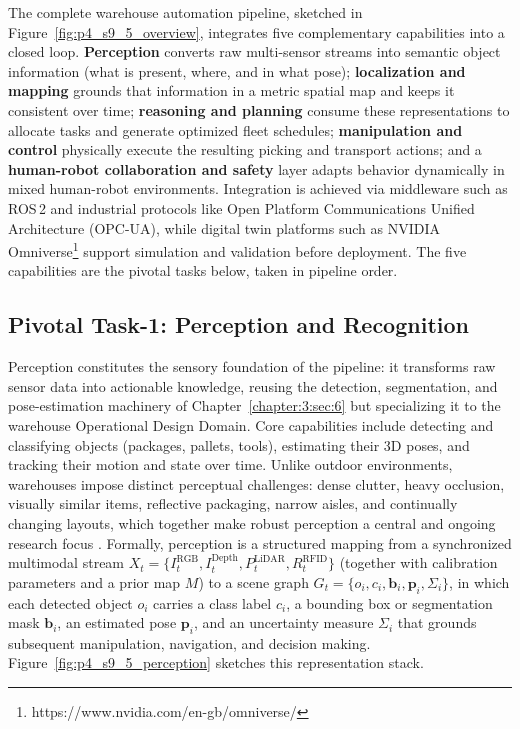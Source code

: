The complete warehouse automation pipeline, sketched in Figure~\ref{fig:p4_s9_5_overview}, integrates five complementary capabilities into a closed loop. 
\textbf{Perception} converts raw multi-sensor streams into semantic object information (what is present, where, and in what pose); 
\textbf{localization and mapping} grounds that information in a metric spatial map and keeps it consistent over time; 
\textbf{reasoning and planning} consume these representations to allocate tasks and generate optimized fleet schedules; 
\textbf{manipulation and control} physically execute the resulting picking and transport actions; 
and a \textbf{human-robot collaboration and safety} layer adapts behavior dynamically in mixed human-robot environments. 
Integration is achieved via middleware such as ROS\,2 and industrial protocols like Open Platform Communications Unified Architecture (OPC-UA), while digital twin platforms such as NVIDIA Omniverse\footnote{https://www.nvidia.com/en-gb/omniverse/} support simulation and validation before deployment. 
The five capabilities are the pivotal tasks below, taken in pipeline order.



\subsection{Pivotal Task-1: Perception and Recognition}
\label{subsec:p4-sec9-5-pivotal-task-1-perception-and-recognition}
Perception constitutes the sensory foundation of the pipeline: it transforms raw sensor data into actionable knowledge, reusing the detection, segmentation, and pose-estimation machinery of Chapter~\ref{chapter:3:sec:6} but specializing it to the warehouse Operational Design Domain. 
Core capabilities include detecting and classifying objects (packages, pallets, tools), estimating their 3D poses, and tracking their motion and state over time. 
Unlike outdoor environments, warehouses impose distinct perceptual challenges: dense clutter, heavy occlusion, visually similar items, reflective packaging, narrow aisles, and continually changing layouts, which together make robust perception a central and ongoing research focus \cite{Tubis2023IntelligentWarehouse,redmon2016yolo}. 
Formally, perception is a structured mapping from a synchronized multimodal stream $X_t = \{I_t^{\text{RGB}}, I_t^{\text{Depth}}, P_t^{\text{LiDAR}}, R_t^{\text{RFID}}\}$ (together with calibration parameters and a prior map $M$) to a scene graph $G_t = \{o_i, c_i, \mathbf{b}_i, \mathbf{p}_i, \Sigma_i\}$, in which each detected object $o_i$ carries a class label $c_i$, a bounding box or segmentation mask $\mathbf{b}_i$, an estimated pose $\mathbf{p}_i$, and an uncertainty measure $\Sigma_i$ that grounds subsequent manipulation, navigation, and decision making. 
Figure~\ref{fig:p4_s9_5_perception} sketches this representation stack.

